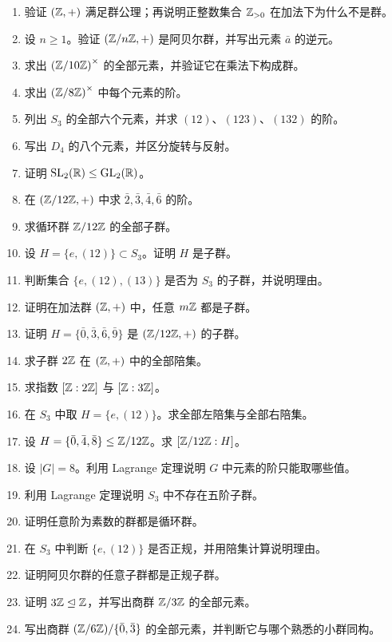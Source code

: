 \begin{enumerate}[label=\textbf{习题6.\arabic*.}, leftmargin=7em]
  \item \basic 验证 $(\mathbb{Z},+)$ 满足群公理；再说明正整数集合 $\mathbb{Z}_{>0}$ 在加法下为什么不是群。
  \item \basic 设 $n\ge1$。验证 $(\mathbb{Z}/n\mathbb{Z},+)$ 是阿贝尔群，并写出元素 $\bar a$ 的逆元。
  \item \basic 求出 $\left(\mathbb{Z}/10\mathbb{Z}\right)^\times$ 的全部元素，并验证它在乘法下构成群。
  \item \basic 求出 $\left(\mathbb{Z}/8\mathbb{Z}\right)^\times$ 中每个元素的阶。
  \item \basic 列出 $S_3$ 的全部六个元素，并求 $(12)$、$(123)$、$(132)$ 的阶。
  \item \basic 写出 $D_4$ 的八个元素，并区分旋转与反射。
  \item \basic 证明 $\mathrm{SL}_2(\mathbb{R})\le \mathrm{GL}_2(\mathbb{R})$。
  \item \basic 在 $(\mathbb{Z}/12\mathbb{Z},+)$ 中求 $\bar 2,\bar 3,\bar 4,\bar 6$ 的阶。
  \item \basic 求循环群 $\mathbb{Z}/12\mathbb{Z}$ 的全部子群。
  \item \basic 设 $H=\{e,(12)\}\subset S_3$。证明 $H$ 是子群。
  \item \basic 判断集合 $\{e,(12),(13)\}$ 是否为 $S_3$ 的子群，并说明理由。
  \item \basic 证明在加法群 $(\mathbb{Z},+)$ 中，任意 $m\mathbb{Z}$ 都是子群。
  \item \basic 证明 $H=\{\bar 0,\bar 3,\bar 6,\bar 9\}$ 是 $(\mathbb{Z}/12\mathbb{Z},+)$ 的子群。
  \item \basic 求子群 $2\mathbb{Z}$ 在 $(\mathbb{Z},+)$ 中的全部陪集。
  \item \basic 求指数 $[\mathbb{Z}:2\mathbb{Z}]$ 与 $[\mathbb{Z}:3\mathbb{Z}]$。
  \item \basic 在 $S_3$ 中取 $H=\{e,(12)\}$。求全部左陪集与全部右陪集。
  \item \basic 设 $H=\{\bar 0,\bar 4,\bar 8\}\le \mathbb{Z}/12\mathbb{Z}$。求 $[\mathbb{Z}/12\mathbb{Z}:H]$。
  \item \basic 设 $|G|=8$。利用 Lagrange 定理说明 $G$ 中元素的阶只能取哪些值。
  \item \basic 利用 Lagrange 定理说明 $S_3$ 中不存在五阶子群。
  \item \basic 证明任意阶为素数的群都是循环群。
  \item \basic 在 $S_3$ 中判断 $\{e,(12)\}$ 是否正规，并用陪集计算说明理由。
  \item \basic 证明阿贝尔群的任意子群都是正规子群。
  \item \basic 证明 $3\mathbb{Z}\trianglelefteq \mathbb{Z}$，并写出商群 $\mathbb{Z}/3\mathbb{Z}$ 的全部元素。
  \item \basic 写出商群 $(\mathbb{Z}/6\mathbb{Z})/\{\bar 0,\bar 3\}$ 的全部元素，并判断它与哪个熟悉的小群同构。

\end{enumerate}
